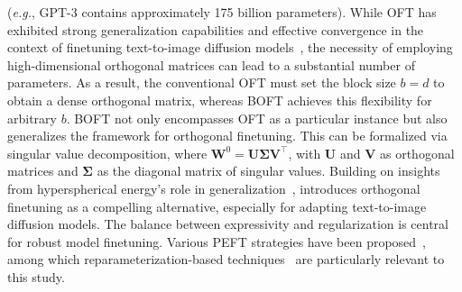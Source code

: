 (\emph{e.g.}, GPT-3 contains approximately 175 billion parameters). While OFT has exhibited strong generalization capabilities and effective convergence in the context of finetuning text-to-image diffusion models~\cite{qiu2023controlling}, the necessity of employing high-dimensional orthogonal matrices can lead to a substantial number of parameters. As a result, the conventional OFT must set the block size $b=d$ to obtain a dense orthogonal matrix, whereas BOFT achieves this flexibility for arbitrary $b$. BOFT not only encompasses OFT as a particular instance but also generalizes the framework for orthogonal finetuning. This can be formalized via singular value decomposition, where $\bm{W}^0=\bm{U}\bm{\Sigma}\bm{V}^\top$, with $\bm{U}$ and $\bm{V}$ as orthogonal matrices and $\bm{\Sigma}$ as the diagonal matrix of singular values. Building on insights from hyperspherical energy's role in generalization~\cite{liu2018learning,liu2021orthogonal}, \cite{qiu2023controlling} introduces orthogonal finetuning as a compelling alternative, especially for adapting text-to-image diffusion models. The balance between expressivity and regularization is central for robust model finetuning. Various PEFT strategies have been proposed~\cite{houlsby2019parameter,aghajanyan2020intrinsic,hulora2022,edalati2022krona,wang2022adamix,gheini2021cross,zaken2022bitfit,guo2020parameter,sung2021training,ansell2022composable,lester2021power,li2021prefix,vu2022spot,he2021towards,mao2021unipelt,karimi2021compacter,liu2022few,sung2022lst,chen2022parameter,jia2022visual,chen2022adaptformer,zhang2022neural,jie2023fact,lian2022scaling,luo2023towards}, among which reparameterization-based techniques~\cite{aghajanyan2020intrinsic,hulora2022,edalati2022krona} are particularly relevant to this study. \begin{theorem}\label{thm:exp_boft}

\end{theorem}
